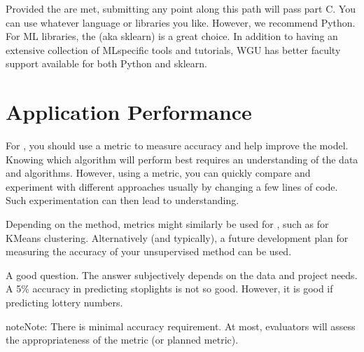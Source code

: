 \documentclass[letterpaper,10pt,english]{jupyterBook}
\begin{document}
\sphinxAtStartPar
Provided the  are met, submitting any point along this path will pass part C. You can use whatever language or libraries you like. However, we recommend Python. For ML libraries,  the  (aka sklearn) is a great choice. In addition to having an extensive collection of ML\sphinxhyphen{}specific tools and tutorials, WGU has better faculty support available for both Python and sklearn.


\section{Application Performance}
\label{\detokenize{task2_c/task2_part_c:application-performance}}\label{\detokenize{task2_c/task2_part_c:task2-part-c-application-performance}}
\sphinxAtStartPar
For , you should use a metric to measure accuracy and help improve the model. Knowing which algorithm will perform best requires an understanding of the data and algorithms. However, using a metric, you can quickly compare and experiment with different approaches \sphinxhyphen{}usually by changing a few lines of code. Such experimentation can then lead to understanding.

\sphinxAtStartPar
Depending on the method, metrics might similarly be used for , such as  for KMeans clustering. Alternatively (and typically), a future development plan for measuring the accuracy of your unsupervised method can be used.

\begin{sphinxShadowBox}

\sphinxAtStartPar
A good question. The answer subjectively depends on the data and project needs. A 5\% accuracy in predicting stoplights is not so good. However, it is  good if predicting lottery numbers.
\end{sphinxShadowBox}

\begin{sphinxadmonition}{note}{Note:}
\sphinxAtStartPar
There is  minimal accuracy requirement. At most, evaluators will assess the appropriateness of the metric (or planned metric).
\end{sphinxadmonition}
\end{document}
